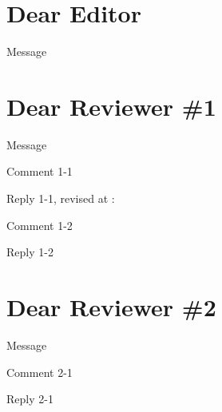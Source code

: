 \documentclass{article}
\def\Message{%
Message
}
\begin{document}
\section*{Dear Editor}

\Message


\newpage
{}
\section*{Dear Reviewer \#1}

\Message


\Comment %
Comment 1-1

\Reply
Reply 1-1, revised at :


\Comment %
Comment 1-2

\Reply
Reply 1-2




\newpage
{}
\section*{Dear Reviewer \#2}

\Message


\Comment %
Comment 2-1

\Reply
Reply 2-1

\end{document}
